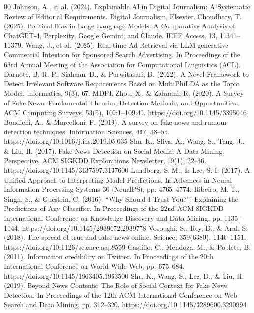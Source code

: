 \documentclass{ieeeaccess}
\begin{document}
\begin{thebibliography}{00}
 Johnson, A., et al. (2024). Explainable AI in Digital Journalism: A Systematic Review of Editorial Requirements. Digital Journalism, Elsevier.
 Choudhary, T. (2025). Political Bias in Large Language Models: A Comparative Analysis of ChatGPT-4, Perplexity, Google Gemini, and Claude. IEEE Access, 13, 11341--11379.
 Wang, J., et al. (2025). Real-time Ad Retrieval via LLM-generative Commercial Intention for Sponsored Search Advertising. In Proceedings of the 63rd Annual Meeting of the Association for Computational Linguistics (ACL).
 Darnoto, B. R. P., Siahaan, D., \& Purwitasari, D. (2022). A Novel Framework to Detect Irrelevant Software Requirements Based on MultiPhiLDA as the Topic Model. Informatics, 9(3), 67. MDPI.
 Zhou, X., \& Zafarani, R. (2020). A Survey of Fake News: Fundamental Theories, Detection Methods, and Opportunities. ACM Computing Surveys, 53(5), 109:1--109:40. https://doi.org/10.1145/3395046
 Bondielli, A., \& Marcelloni, F. (2019). A survey on fake news and rumour detection techniques. Information Sciences, 497, 38--55. https://doi.org/10.1016/j.ins.2019.05.035
 Shu, K., Sliva, A., Wang, S., Tang, J., \& Liu, H. (2017). Fake News Detection on Social Media: A Data Mining Perspective. ACM SIGKDD Explorations Newsletter, 19(1), 22--36. https://doi.org/10.1145/3137597.3137600
 Lundberg, S. M., \& Lee, S.-I. (2017). A Unified Approach to Interpreting Model Predictions. In Advances in Neural Information Processing Systems 30 (NeurIPS), pp. 4765--4774.
 Ribeiro, M. T., Singh, S., \& Guestrin, C. (2016). ``Why Should I Trust You?'': Explaining the Predictions of Any Classifier. In Proceedings of the 22nd ACM SIGKDD International Conference on Knowledge Discovery and Data Mining, pp. 1135--1144. https://doi.org/10.1145/2939672.2939778
 Vosoughi, S., Roy, D., \& Aral, S. (2018). The spread of true and false news online. Science, 359(6380), 1146--1151. https://doi.org/10.1126/science.aap9559
 Castillo, C., Mendoza, M., \& Poblete, B. (2011). Information credibility on Twitter. In Proceedings of the 20th International Conference on World Wide Web, pp. 675--684. https://doi.org/10.1145/1963405.1963500
 Shu, K., Wang, S., Lee, D., \& Liu, H. (2019). Beyond News Contents: The Role of Social Context for Fake News Detection. In Proceedings of the 12th ACM International Conference on Web Search and Data Mining, pp. 312--320. https://doi.org/10.1145/3289600.3290994
\end{thebibliography}
\end{document}

